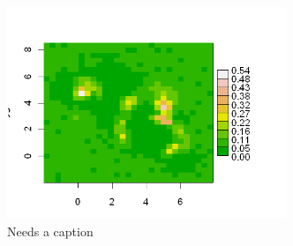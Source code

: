 \begin{figure}
\begin{center}
\includegraphics[height=2.5in]{figs/densitymap2}
\end{center}
\caption{Needs a caption}
\label{fig.densitymap2}
\end{figure}

